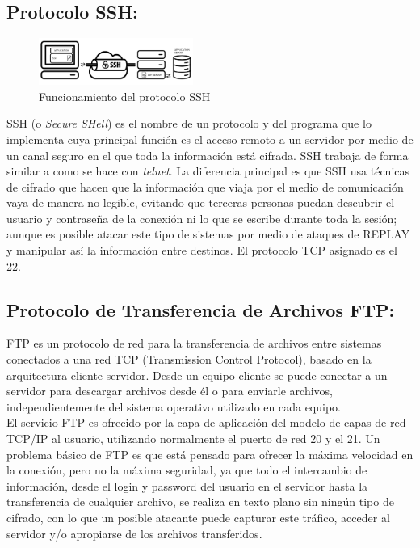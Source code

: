 \documentclass[conference]{IEEEtran}
\begin{document}
\subsection{\textbf{Protocolo SSH:}}
\begin{figure}[h]
	\centerline{\includegraphics[width=0.45\textwidth]{img/ant02.png}}
	\caption{Funcionamiento del protocolo SSH}
	\label{fig:ant02}
\end{figure}

SSH (o \textit{Secure SHell}) es el nombre de un protocolo y del programa que lo implementa cuya principal función es el acceso remoto a un servidor por medio de un canal seguro en el que toda la información está cifrada. SSH trabaja de forma similar a como se hace con \textit{telnet}. La diferencia principal es que SSH usa técnicas de cifrado que hacen que la información que viaja por el medio de comunicación vaya de manera no legible, evitando que terceras personas puedan descubrir el usuario y contraseña de la conexión ni lo que se escribe durante toda la sesión; aunque es posible atacar este tipo de sistemas por medio de ataques de REPLAY y manipular así la información entre destinos. El protocolo TCP asignado es el 22.

\subsection{\textbf{ Protocolo de Transferencia de Archivos FTP:}}
FTP es un protocolo de red para la transferencia de archivos entre sistemas conectados a una red TCP (Transmission Control Protocol), basado en la arquitectura cliente-servidor. Desde un equipo cliente se puede conectar a un servidor para descargar archivos desde él o para enviarle archivos, independientemente del sistema operativo utilizado en cada equipo.\\
El servicio FTP es ofrecido por la capa de aplicación del modelo de capas de red TCP/IP al usuario, utilizando normalmente el puerto de red 20 y el 21. Un problema básico de FTP es que está pensado para ofrecer la máxima velocidad en la conexión, pero no la máxima seguridad, ya que todo el intercambio de información, desde el login y password del usuario en el servidor hasta la transferencia de cualquier archivo, se realiza en texto plano sin ningún tipo de cifrado, con lo que un posible atacante puede capturar este tráfico, acceder al servidor y/o apropiarse de los archivos transferidos.
\end{document}

